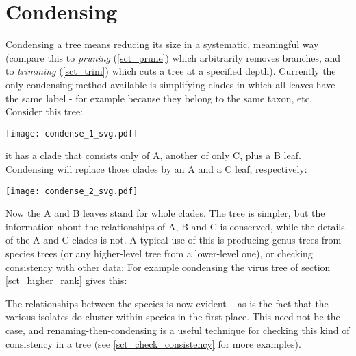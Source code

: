 \section{Condensing}
\label{sct_condense}

Condensing a tree means reducing its size in a systematic, meaningful way
(compare this to \emph{pruning} (\ref{sct_prune}) which arbitrarily removes
branches, and to \textit{trimming} (\ref{sct_trim}) which cuts a tree at a
specified depth). Currently the only condensing method available is
simplifying clades in which all leaves have the same label - for example
because they belong to the same taxon, etc. Consider this tree:

\begin{center}
\texttt{[image: condense\_1\_svg.pdf]}
\end{center}

\noindent{}it has a clade that consists only of A, another of only C, plus a B
leaf.  Condensing will replace those clades by an A and a C leaf,
respectively:


\begin{center}
\texttt{[image: condense\_2\_svg.pdf]}
\end{center}

\noindent{}Now the A and B leaves stand for whole clades. The tree is simpler,
but the information about the relationships of A, B and C is conserved, while
the details of the A and C clades is not.  A typical use of this is producing
genus trees from species trees (or any higher-level tree from a lower-level
one), or checking consistency with other data: For example condensing the virus
tree of section \ref{sct_higher_rank} gives this:

\begin{center}
\end{center}

\noindent{}The relationships between the species is now evident -- as is the
fact that the various isolates do cluster within species in the first place.
This need not be the case, and renaming-then-condensing is a useful technique
for checking this kind of consistency in a tree (see
\ref{sct_check_consistency} for more examples).
